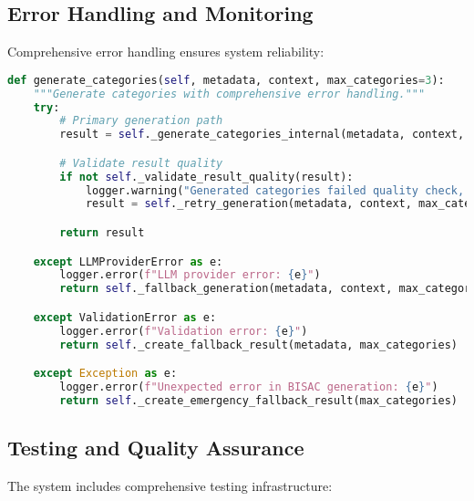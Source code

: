 \documentclass{article}
\begin{document}
\subsection{Error Handling and Monitoring}

Comprehensive error handling ensures system reliability:

\begin{lstlisting}[language=python, caption=Error Handling Framework]
def generate_categories(self, metadata, context, max_categories=3):
    """Generate categories with comprehensive error handling."""
    try:
        # Primary generation path
        result = self._generate_categories_internal(metadata, context, max_categories)

        # Validate result quality
        if not self._validate_result_quality(result):
            logger.warning("Generated categories failed quality check, retrying...")
            result = self._retry_generation(metadata, context, max_categories)

        return result

    except LLMProviderError as e:
        logger.error(f"LLM provider error: {e}")
        return self._fallback_generation(metadata, context, max_categories)

    except ValidationError as e:
        logger.error(f"Validation error: {e}")
        return self._create_fallback_result(metadata, max_categories)

    except Exception as e:
        logger.error(f"Unexpected error in BISAC generation: {e}")
        return self._create_emergency_fallback_result(max_categories)
\end{lstlisting}

\subsection{Testing and Quality Assurance}

The system includes comprehensive testing infrastructure:
\end{document}

